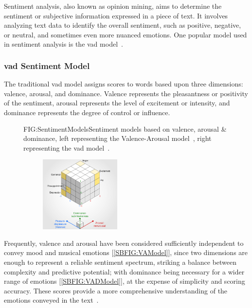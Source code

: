 Sentiment analysis, also known as opinion mining, aims to determine the sentiment or subjective information expressed in a piece of text. It involves analyzing text data to identify the overall sentiment, such as positive, negative, or neutral, and sometimes even more nuanced emotions. One popular model used in sentiment analysis is the \ac{vad} model~\cite{VAD-MODEL}.

\subsubsection{\acs{vad} Sentiment Model}

The traditional \acs{vad} model assigns scores to words based upon three dimensions: valence, arousal, and dominance. Valence represents the pleasantness or positivity of the sentiment, arousal represents the level of excitement or intensity, and dominance represents the degree of control or influence.

\begin{figure}[Valence-Arousal-Dominance sentiment models]{FIG:SentimentModels}{Sentiment models based on valence, arousal \& dominance, left representing the Valence-Arousal model~\cite{WIKI:VA-MODEL}, right representing the \acl{vad} model~\cite{WIKI:PAD-MODEL}.}
    \begin{subfigure}[SBFIG:VAModel]{Circumplex Valence-Arousal model}{}
    \end{subfigure}
    \begin{subfigure}[SBFIG:VADModel]{Three-dimensional \acl{vad} model}{\includegraphics[width=0.445\textwidth]{img/VADModel.png}}
    \end{subfigure}
\end{figure}

Frequently, valence and arousal have been considered sufficiently independent to convey mood and musical emotions [\ref{SBFIG:VAModel}], since two dimensions are enough to represent a reliable sentiment spectrum, striking a balance between complexity and predictive potential; with dominance being necessary for a wider range of emotions [\ref{SBFIG:VADModel}], at the expense of simplicity and scoring accuracy. These scores provide a more comprehensive understanding of the emotions conveyed in the text~\cite{EMOTION-MODELS}.

